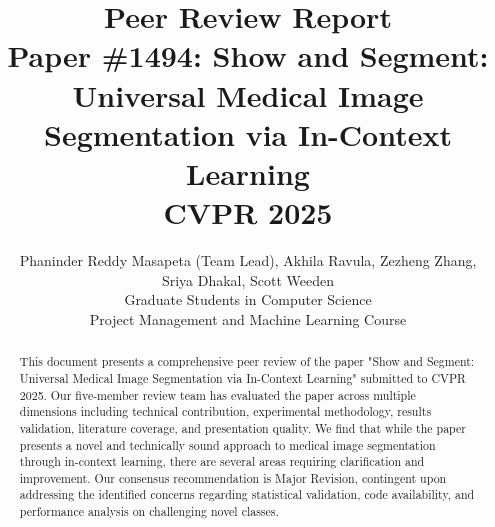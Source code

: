 \documentclass[10pt,twocolumn,letterpaper]{article}
\title{Peer Review Report\\
Paper \#1494: Show and Segment: Universal Medical Image\\
Segmentation via In-Context Learning\\
\vspace{0.5em}
{\large CVPR 2025}
}
\author{Phaninder Reddy Masapeta (Team Lead), Akhila Ravula, Zezheng Zhang,\\
Sriya Dhakal, Scott Weeden\\
Graduate Students in Computer Science\\
Project Management and Machine Learning Course
}
\begin{document}
\maketitle

\begin{abstract}
This document presents a comprehensive peer review of the paper "Show and Segment: Universal Medical Image Segmentation via In-Context Learning" submitted to CVPR 2025. Our five-member review team has evaluated the paper across multiple dimensions including technical contribution, experimental methodology, results validation, literature coverage, and presentation quality. We find that while the paper presents a novel and technically sound approach to medical image segmentation through in-context learning, there are several areas requiring clarification and improvement. Our consensus recommendation is Major Revision, contingent upon addressing the identified concerns regarding statistical validation, code availability, and performance analysis on challenging novel classes.
\end{abstract}





















\balance

{
    \small
    
}
\end{document}
